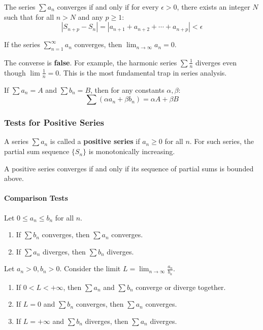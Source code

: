 \begin{theorem}
The series $\sum a_n$ converges if and only if for every $\epsilon > 0$, there exists an integer $N$ such that for all $n > N$ and any $p \ge 1$:
\[ |S_{n+p} - S_n| = |a_{n+1} + a_{n+2} + \cdots + a_{n+p}| < \epsilon \]
\end{theorem}

\begin{theorem}
If the series $\sum_{n=1}^{\infty} a_n$ converges, then $\lim_{n \to \infty} a_n = 0$.
\end{theorem}

The converse is \textbf{false}. For example, the harmonic series $\sum \frac{1}{n}$ diverges even though $\lim \frac{1}{n} = 0$. This is the most fundamental trap in series analysis.


\begin{property}[Linearity]
If $\sum a_n = A$ and $\sum b_n = B$, then for any constants $\alpha, \beta$:
\[ \sum (\alpha a_n + \beta b_n) = \alpha A + \beta B \]
\end{property}

\subsubsection{Tests for Positive Series}

A series $\sum a_n$ is called a \textbf{positive series} if $a_n \ge 0$ for all $n$.
For such series, the partial sum sequence $\{S_n\}$ is monotonically increasing.
\begin{theorem}
A positive series converges if and only if its sequence of partial sums is bounded above.
\end{theorem}

\paragraph{Comparison Tests}
\begin{theorem}
Let $0 \le a_n \le b_n$ for all $n$.
\begin{enumerate}
    \item If $\sum b_n$ converges, then $\sum a_n$ converges.
    \item If $\sum a_n$ diverges, then $\sum b_n$ diverges.
\end{enumerate}
\end{theorem}

\begin{theorem}
Let $a_n > 0, b_n > 0$. Consider the limit $L = \lim_{n \to \infty} \frac{a_n}{b_n}$.
\begin{enumerate}
    \item If $0 < L < +\infty$, then $\sum a_n$ and $\sum b_n$ converge or diverge together.
    \item If $L = 0$ and $\sum b_n$ converges, then $\sum a_n$ converges.
    \item If $L = +\infty$ and $\sum b_n$ diverges, then $\sum a_n$ diverges.
\end{enumerate}
\end{theorem}

